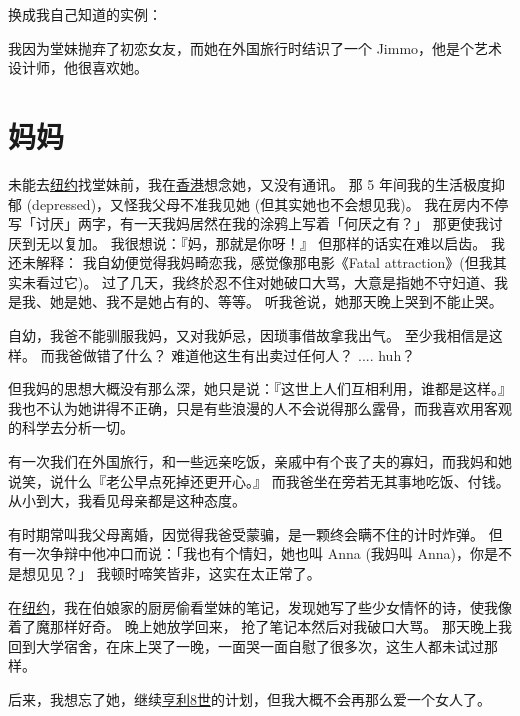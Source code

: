 \documentclass[12pt]{report}
\begin{document}
换成我自己知道的实例：
\begin{center}
\end{center}
我因为堂妹抛弃了初恋女友，而她在外国旅行时结识了一个 Jimmo，他是个艺术设计师，他很喜欢她。

\chapter{妈妈}

未能去\uline{纽约}找堂妹前，我在\uline{香港}想念她，又没有通讯。 那 5 年间我的生活极度抑郁 (depressed)，又怪我父母不准我见她 (但其实她也不会想见我)。 我在房内不停写「讨厌」两字，有一天我妈居然在我的涂鸦上写着「何厌之有？」 那更使我讨厌到无以复加。 我很想说：『妈，那就是你呀！』 但那样的话实在难以启齿。 我还未解释： 我自幼便觉得我妈畸恋我，感觉像那电影《Fatal attraction》(但我其实未看过它)。 过了几天，我终於忍不住对她破口大骂，大意是指她不守妇道、我是我、她是她、我不是她占有的、等等。 听我爸说，她那天晚上哭到不能止哭。

自幼，我爸不能驯服我妈，又对我妒忌，因琐事借故拿我出气。 至少我相信是这样。 而我爸做错了什么？ 难道他这生有出卖过任何人？ .... huh？

但我妈的思想大概没有那么深，她只是说：『这世上人们互相利用，谁都是这样。』 我也不认为她讲得不正确，只是有些浪漫的人不会说得那么露骨，而我喜欢用客观的科学去分析一切。

有一次我们在外国旅行，和一些远亲吃饭，亲戚中有个丧了夫的寡妇，而我妈和她说笑，说什么『老公早点死掉还更开心。』 而我爸坐在旁若无其事地吃饭、付钱。 从小到大，我看见母亲都是这种态度。

有时期常叫我父母离婚，因觉得我爸受蒙骗，是一颗终会瞒不住的计时炸弹。 但有一次争辩中他冲口而说：「我也有个情妇，她也叫 Anna (我妈叫 Anna)，你是不是想见见？」 我顿时啼笑皆非，这实在太正常了。

在\uline{纽约}，我在伯娘家的厨房偷看堂妹的笔记，发现她写了些少女情怀的诗，使我像着了魔那样好奇。 晚上她放学回来， 抢了笔记本然后对我破口大骂。 那天晚上我回到大学宿舍，在床上哭了一晚，一面哭一面自慰了很多次，这生人都未试过那样。

后来，我想忘了她，继续\uline{亨利8世}的计划，但我大概不会再那么爱一个女人了。
\end{document}
